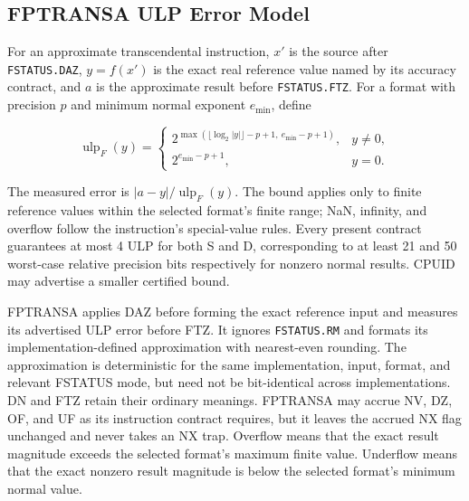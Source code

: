 \subsection{FPTRANSA ULP Error Model}
For an approximate transcendental instruction, $x'$ is the source after \texttt{FSTATUS.DAZ}, $y=f(x')$ is the
exact real reference value named by its accuracy contract, and $a$ is the approximate result before
\texttt{FSTATUS.FTZ}. For a format with precision $p$ and minimum normal exponent $e_{\min}$, define

\[
  \operatorname{ulp}_F(y) =
  \begin{cases}
    2^{\max(\lfloor\log_2 |y|\rfloor-p+1,\ e_{\min}-p+1)}, & y\ne0,\\
    2^{e_{\min}-p+1}, & y=0.
  \end{cases}
\]

The measured error is $|a-y|/\operatorname{ulp}_F(y)$. The bound applies only to finite reference values within
the selected format's finite range; NaN, infinity, and overflow follow the instruction's special-value rules.
Every present contract guarantees at most 4 ULP for both S and D, corresponding to at least 21 and 50 worst-case
relative precision bits respectively for nonzero normal results. CPUID may advertise a smaller certified bound.

FPTRANSA applies DAZ before forming the exact reference input and measures its advertised ULP error before FTZ.
It ignores \texttt{FSTATUS.RM} and formats its implementation-defined approximation with nearest-even rounding.
The approximation is deterministic for the same implementation, input, format, and relevant FSTATUS mode, but need
not be bit-identical across implementations. DN and FTZ retain their ordinary meanings. FPTRANSA may accrue NV, DZ,
OF, and UF as its instruction contract requires, but it leaves the accrued NX flag unchanged and never takes an NX
trap. Overflow means that the exact result magnitude exceeds the selected format's maximum finite value. Underflow
means that the exact nonzero result magnitude is below the selected format's minimum normal value.

\clearpage
